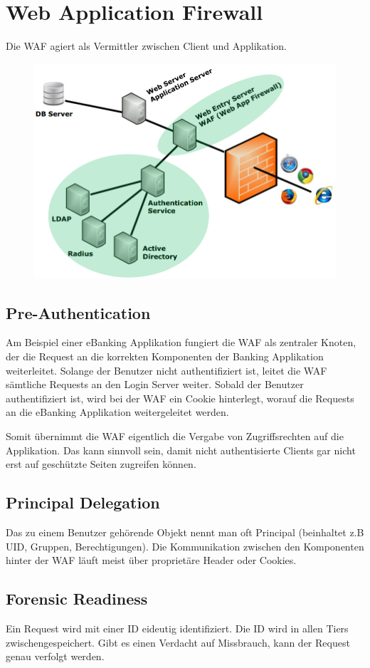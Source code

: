 \section{Web Application Firewall}
Die WAF agiert als Vermittler zwischen Client und Applikation.
\begin{figure}[h!]
	\centering
	\includegraphics[width=0.7\linewidth]{images/waf}
	\caption[Web Application Firewall]{}
	\caption{}
	\label{fig:waf}
\end{figure}

\subsection{Pre-Authentication}
Am Beispiel einer eBanking Applikation fungiert die WAF als zentraler Knoten, der die Request an die korrekten Komponenten der Banking Applikation weiterleitet. Solange der Benutzer nicht authentifiziert ist, leitet die WAF sämtliche Requests an den Login Server weiter. Sobald der Benutzer authentifiziert ist, wird bei der WAF ein Cookie hinterlegt, worauf die Requests an die eBanking Applikation weitergeleitet werden.

Somit übernimmt die WAF eigentlich die Vergabe von Zugriffsrechten auf die Applikation. Das kann sinnvoll sein, damit nicht authentisierte Clients gar nicht erst auf geschützte Seiten zugreifen können.

\subsection{Principal Delegation}
Das zu einem Benutzer gehörende Objekt nennt man oft Principal (beinhaltet z.B UID, Gruppen, Berechtigungen).
Die Kommunikation zwischen den Komponenten hinter der WAF läuft meist über proprietäre Header oder Cookies. 

\subsection{Forensic Readiness}
Ein Request wird mit einer ID eideutig identifiziert. Die ID wird in allen Tiers zwischengespeichert. Gibt es einen Verdacht auf Missbrauch, kann der Request genau verfolgt werden. 

